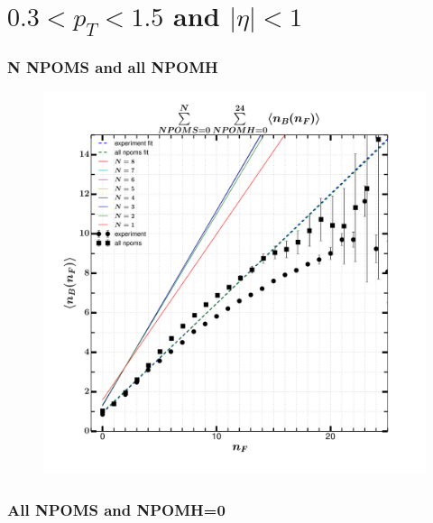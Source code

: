 \documentclass[]{article}
\begin{document}
\section*{\centering $ 0.3 < p_T < 1.5$ and $ |\eta|<1$}
\subsubsection*{\centering N NPOMS and all NPOMH}
\begin{figure}[h!]
\centering
\includegraphics[scale=0.5]{../analyzed/nbnf_Nnpoms_allnpomh.pdf}
\caption{}
\end{figure}

\begin{center}
\end{center}

\newpage
\subsubsection*{\centering All NPOMS and NPOMH=0}
\end{document}
